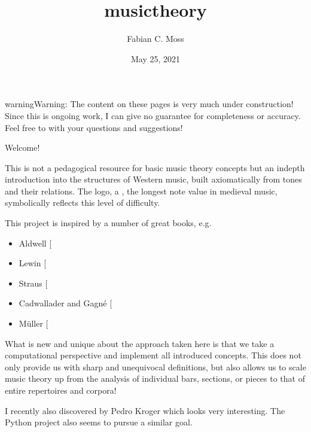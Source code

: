 \documentclass[letterpaper,10pt,english]{sphinxmanual}
\title{musictheory}
\date{May 25, 2021}
\author{Fabian C.\@{} Moss}
\begin{document}
\pagestyle{empty}
\sphinxmaketitle
\pagestyle{plain}
\sphinxtableofcontents
\pagestyle{normal}
\label{\detokenize{index::doc}}


\begin{sphinxadmonition}{warning}{Warning:}
The content on these pages is very much under construction!
Since this is ongoing work, I can give no guarantee for completeness or accuracy.
Feel free to  with your questions and suggestions!
\end{sphinxadmonition}

Welcome!

This is not a pedagogical resource for basic music theory concepts
but an in\sphinxhyphen{}depth introduction into the structures of Western music,
built axiomatically from tones and their relations.
The logo, a , the longest note value in medieval music,
symbolically reflects this level of difficulty.

This project is inspired by a number of great books, e.g.
\begin{itemize}
\item {} 
Aldwell  {[}\sphinxcite{8_bibliography:id4}{]}

\item {} 
Lewin {[}\sphinxcite{8_bibliography:id2}{]}

\item {} 
Straus {[}\sphinxcite{8_bibliography:id3}{]}

\item {} 
Cadwallader and Gagné {[}\sphinxcite{8_bibliography:id5}{]}

\item {} 
Müller {[}\sphinxcite{8_bibliography:id6}{]}

\end{itemize}

What is new and unique about the approach taken here is that we take
a computational perspective and implement all introduced concepts.
This does not only provide us with sharp and unequivocal definitions,
but also allows us to scale music theory up from the analysis of individual
bars, sections, or pieces to that of entire repertoires and corpora!

I recently also discovered  by Pedro Kroger
which looks very interesting.
The Python project  also seems to pursue a similar goal.
\end{document}
